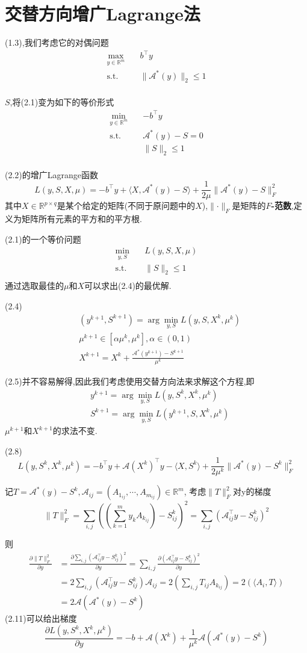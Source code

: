\documentclass[UTF8]{ctexart}
\newcommand{\s}{\quad}
\renewcommand{\b}{\textbf}
\newcommand{\p}{\paragraph{}\s}
\newcommand{\sect}{\section}
\newcommand{\equSplit}[1]{\begin{equation}\begin{split}#1\end{split}\end{equation}}
\newcommand{\equAlign}[1]{\begin{align}#1\end{align}}
\newcommand{\equ}[1]{\begin{equation}#1\end{equation}}
\newcommand{\Tst}{\text{s.t.}\s}
\newcommand{\norm}[1]{\lVert#1\rVert}
\newcommand{\inprod}[1]{\langle#1\rangle}
\newcommand{\Real}[1]{\mathbb{R}^{#1}}
\newcommand{\nunorm}{\norm{X}_*}
\newcommand{\Ma}{\mathcal{A}}
\newcommand{\partD}[2]{\frac{\partial#1}{\partial#2}}
\numberwithin{equation}{section}
\begin{document}
	\sect{交替方向增广Lagrange法}
		(1.3),我们考虑它的对偶问题
		\equSplit{
			\max_{y\in\Real{m}}\s&b^\top y\\
			\Tst&\norm{\Ma^*(y)}_2\leq1\\
		}

		$S$,将(2.1)变为如下的等价形式
		\equSplit{
			\min_{y\in\Real{m}}\s&-b^\top y\\
			\Tst&\Ma^*(y)-S=0\\
			&\norm{S}_2\leq1\\
		}

		(2.2)的增广Lagrange函数
		\equ{L(y,S,X,\mu)=-b^\top y+\inprod{X,\Ma^*(y)-S}+\frac{1}{2\mu}\norm{\Ma^*(y)-S}^2_F}
		其中$X\in\Real{p\times q}$是某个给定的矩阵(不同于原问题中的$X$),$\norm{\cdot}_F$是矩阵的\b{$F$-范数},定义为矩阵所有元素的平方和的平方根.

		(2.1)的一个等价问题
		\equSplit{
			\min_{y,S}\s&L(y,S,X,\mu)\\
			\Tst&\norm{S}_2\leq1\\
		}
		通过选取最佳的$\mu$和$X$可以求出(2.4)的最优解.

		(2.4)
		\equAlign{
			&(y^{k+1},S^{k+1})=\arg\min_{y,S}L(y,S,X^k,\mu^k)\\
			&\mu^{k+1}\in[\alpha\mu^k,\mu^k],\alpha\in(0,1)\\
			&X^{k+1}=X^k+\frac{\Ma^*(y^{k+1})-S^{k+1}}{\mu^k}
		}

		(2.5)并不容易解得,因此我们考虑使用交替方向法来求解这个方程,即
		\equAlign{
			&y^{k+1}=\arg\min_{y,S}L(y,S^k,X^k,\mu^k)\\
			&S^{k+1}=\arg\min_{y,S}L(y^{k+1},S,X^k,\mu^k)
		}
		$\mu^{k+1}$和$X^{k+1}$的求法不变.

		(2.8)
		\equ{L(y,S^k,X^k,\mu^k)=-b^\top y+\Ma(X^k)^\top y-\inprod{X,S^k}+\frac{1}{2\mu^k}\norm{\Ma^*(y)-S^k}^2_F}

		记$T=\Ma^*(y)-S^k,\Ma_{ij}=(A_{1_{ij}},\cdots,A_{m_{ij}})\in\Real{m}$,
		考虑$\norm{T}^2_F$对y的梯度
		\[\norm{T}^2_F=\sum_{i,j}((\sum^m_{k=1}y_kA_{k_{ij}})-S^k_{ij})^2=\sum_{i,j}(\Ma_{ij}^\top y-S^k_{ij})^2\]

		则
		\equ{
			\begin{aligned}
				\partD{\norm{T}^2_F}{y} & =\partD{\sum_{i,j}(\Ma_{ij}^\top y-S^k_{ij})^2}{y}=\sum_{i,j}\partD{(\Ma_{ij}^\top y-S^k_{ij})^2}{y} \\
										& =2\sum_{i,j}(\Ma_{ij}^\top y-S^k_{ij})\Ma_{ij}=2(\sum_{i,j}T_{ij}A_{k_{ij}})=2(\inprod{A_i,T})       \\
										& =2\Ma(\Ma^*(y)-S^k)
			\end{aligned}
		}
		(2.11)可以给出梯度
		\equ{
			\partD{L(y,S^k,X^k,\mu^k)}{y}=-b+\Ma(X^k)+\frac{1}{\mu^k}\Ma(\Ma^*(y)-S^k)
		}
\end{document}
